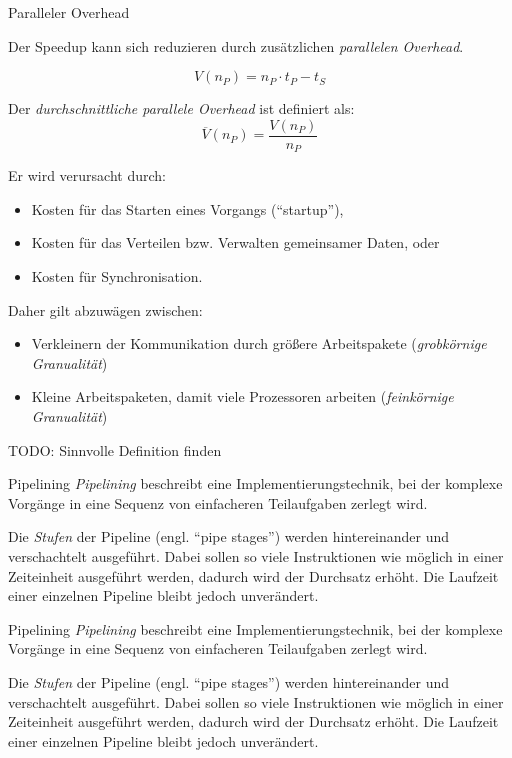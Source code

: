 \begin{defi}{Paralleler Overhead}

    Der Speedup kann sich reduzieren durch zusätzlichen \emph{parallelen Overhead}.

    \[
        V(n_P) = n_P \cdot t_P - t_S
    \]

    Der \emph{durchschnittliche parallele Overhead} ist definiert als:
    \[
        \overline{V}(n_P) = \frac{V(n_P)}{n_P}
    \]

    Er wird verursacht durch:
    \begin{itemize}
        \item Kosten für das Starten eines Vorgangs (\enquote{startup}),
        \item Kosten für das Verteilen bzw. Verwalten gemeinsamer Daten, oder
        \item Kosten für Synchronisation.
    \end{itemize}

    Daher gilt abzuwägen zwischen:
    \begin{itemize}
        \item Verkleinern der Kommunikation durch größere Arbeitspakete (\emph{grobkörnige Granualität})
        \item Kleine Arbeitspaketen, damit viele Prozessoren arbeiten (\emph{feinkörnige Granualität})
    \end{itemize}

    TODO: Sinnvolle Definition finden
\end{defi}

\begin{defi}{Pipelining}
    \emph{Pipelining} beschreibt eine Implementierungstechnik, bei der komplexe Vorgänge in eine Sequenz von einfacheren Teilaufgaben zerlegt wird.

    Die \emph{Stufen} der Pipeline (engl. \enquote{pipe stages}) werden hintereinander und verschachtelt ausgeführt.
    Dabei sollen so viele Instruktionen wie möglich in einer Zeiteinheit ausgeführt werden, dadurch wird der Durchsatz erhöht.
    Die Laufzeit einer einzelnen Pipeline bleibt jedoch unverändert.
\end{defi}

\begin{example}{Pipelining}
    \emph{Pipelining} beschreibt eine Implementierungstechnik, bei der komplexe Vorgänge in eine Sequenz von einfacheren Teilaufgaben zerlegt wird.

    Die \emph{Stufen} der Pipeline (engl. \enquote{pipe stages}) werden hintereinander und verschachtelt ausgeführt.
    Dabei sollen so viele Instruktionen wie möglich in einer Zeiteinheit ausgeführt werden, dadurch wird der Durchsatz erhöht.
    Die Laufzeit einer einzelnen Pipeline bleibt jedoch unverändert.
\end{example}

